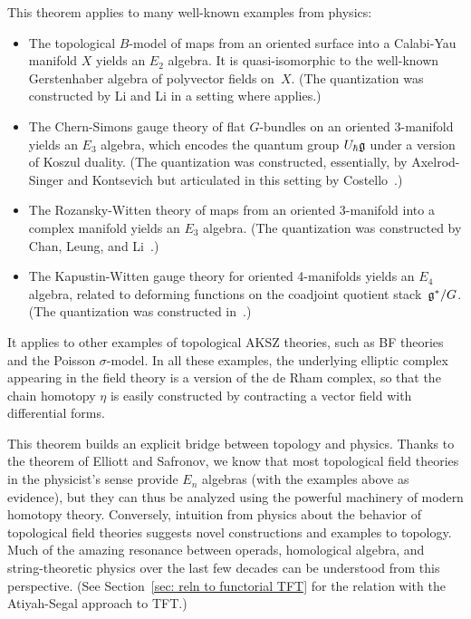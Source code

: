 \documentclass[11pt]{amsart}
\begin{document}
This theorem applies to many well-known examples from physics:
\begin{itemize}
\item The topological $B$-model of maps from an oriented surface into a Calabi-Yau manifold $X$ yields an $E_2$ algebra. It is quasi-isomorphic to the well-known Gerstenhaber algebra of polyvector fields on~$X$. (The quantization was constructed by Li and Li \cite{LiLi} in a setting where \cite{EllSaf} applies.)
\item The Chern-Simons gauge theory of flat $G$-bundles on an oriented 3-manifold yields an $E_3$ algebra, which encodes the quantum group $U_\hbar \mathfrak g$ under a version of Koszul duality. 
(The quantization was constructed, essentially, by Axelrod-Singer \cite{AxeSing1,AxeSing2} and Kontsevich \cite{KonECM} but articulated in this setting by Costello~\cite{CosBook}.) 
\item The Rozansky-Witten theory of maps from an oriented 3-manifold into a complex manifold yields an $E_3$ algebra. (The quantization was constructed by Chan, Leung, and Li~\cite{ChanLeungLi}.)
\item The Kapustin-Witten gauge theory for oriented 4-manifolds yields an $E_4$ algebra, related to deforming functions on the coadjoint quotient stack~$\mathfrak g^*/G$. (The quantization was constructed in~\cite{EGW}.)
\end{itemize}
It applies to other examples of topological AKSZ theories, such as BF theories and the Poisson $\sigma$-model.
In all these examples, the underlying elliptic complex appearing in the field theory is a version of the de Rham complex,
so that the chain homotopy $\eta$ is easily constructed by contracting a vector field with differential forms.

This theorem builds an explicit bridge between topology and physics. 
Thanks to the theorem of Elliott and Safronov, we know that most topological field theories in the physicist's sense provide $E_n$ algebras (with the examples above as evidence),
but they can thus be analyzed using the powerful machinery of modern homotopy theory. 
Conversely, intuition from physics about the behavior of topological field theories suggests novel constructions and examples to topology. 
Much of the amazing resonance between operads, homological algebra, and string-theoretic physics over the last few decades can be understood from this perspective.
(See Section~\ref{sec: reln to functorial TFT} for the relation with the Atiyah-Segal approach to TFT.)
\end{document}
